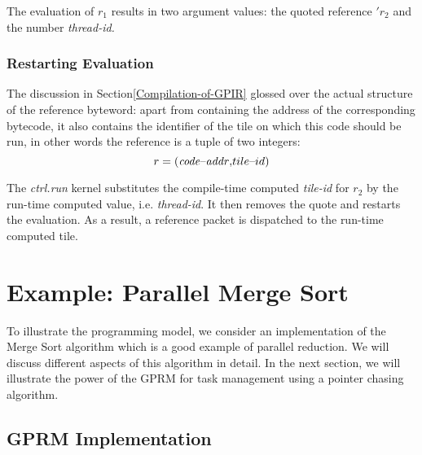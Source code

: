 \documentclass[copyright,creativecommons]{eptcs}
\begin{document}
The evaluation of $r_{1}$ results in two argument values: the quoted
reference $'r_{2}$ and the number \emph{thread-id. }


\subsubsection{Restarting Evaluation}

The discussion in Section\ref{Compilation-of-GPIR} glossed over the
actual structure of the reference byteword: apart from containing
the address of the corresponding bytecode, it also contains the identifier
of the tile on which this code should be run, in other words the reference
is a tuple of two integers: 
\[
r=({\it code\text{–}addr,}tile\text{–}id)
\]


The \emph{ctrl.run} kernel substitutes the compile-time computed \emph{tile-id}
for $r_{2}$ by the run-time computed value, i.e. \emph{thread-id}.
It then removes the quote and restarts the evaluation. As a result,
a reference packet is dispatched to the run-time computed tile.


\section{Example: Parallel Merge Sort}

To illustrate the programming model, we consider an implementation
of the Merge Sort algorithm which is a good example of parallel reduction.
We will discuss different aspects of this algorithm in detail. In
the next section, we will illustrate the power of the GPRM for task
management using a pointer chasing algorithm.


\subsection{GPRM Implementation}
\end{document}

